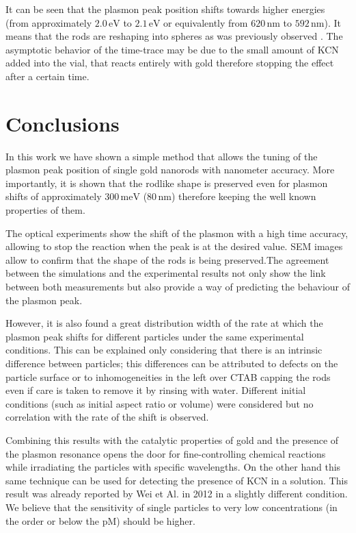 \documentclass[twocolumn]{article}
\begin{document}
It can be seen that the plasmon peak position shifts towards higher energies
(from approximately $2.0\,\textrm{eV}$ to $2.1\,\textrm{eV}$ or equivalently
from $620\,\textrm{nm}$ to $592\,\textrm{nm}$). It means that the rods are
reshaping into spheres as was previously observed \cite{Jana2002}. The
asymptotic behavior of the time-trace may be due to the small amount of KCN
added into the vial, that reacts entirely with gold therefore stopping the
effect after a certain time.

\section{Conclusions}
In this work we have shown a simple method that allows the tuning of the plasmon
peak position of single gold nanorods with nanometer accuracy. More
importantly, it is shown that the rodlike shape is preserved even for plasmon
shifts of approximately $300\,\textrm{meV}$ ($80\,\textrm{nm}$) therefore
keeping the well known properties of them.

The optical experiments show the shift of the plasmon with a high time accuracy,
allowing to stop the reaction when the peak is at the desired value. SEM images
allow to confirm that the shape of the rods is being preserved.The agreement
between the simulations and the experimental results not only show the link
between both measurements but also provide a way of predicting the behaviour of
the plasmon peak.

However, it is also found a great distribution width of the rate at which the
plasmon peak shifts for different particles under the same experimental
conditions. This can be explained only considering that there is an intrinsic
difference between particles; this differences can be attributed to defects on
the particle surface or to inhomogeneities in the left over CTAB capping the
rods even if care is taken to remove it by rinsing with water. Different initial
conditions (such as initial aspect ratio or volume) were considered but no
correlation with the rate of the shift is observed.

Combining this results with the catalytic properties of gold and the presence of
the plasmon resonance opens the door for fine-controlling chemical reactions
while irradiating the particles with specific wavelengths. On the other hand
this same technique can be used for detecting the presence of KCN in a
solution. This result was already reported by Wei et Al. in 2012 \cite{Wei2012}
in a slightly different condition. We believe that the sensitivity of single
particles to very low concentrations (in the order or below the pM) should be
higher.

{}

\end{document}
